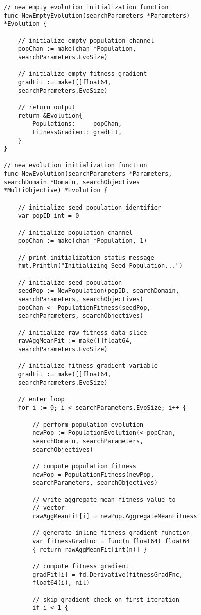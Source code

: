 \begin{lstlisting}[basicstyle=\small]
// new empty evolution initialization function
func NewEmptyEvolution(searchParameters *Parameters) 
*Evolution {

	// initialize empty population channel
	popChan := make(chan *Population, 
	searchParameters.EvoSize)

	// initialize empty fitness gradient
	gradFit := make([]float64, 
	searchParameters.EvoSize)

	// return output
	return &Evolution{
		Populations:     popChan,
		FitnessGradient: gradFit,
	}
}

// new evolution initialization function
func NewEvolution(searchParameters *Parameters, 
searchDomain *Domain, searchObjectives 
*MultiObjective) *Evolution {

	// initialize seed population identifier
	var popID int = 0

	// initialize population channel
	popChan := make(chan *Population, 1)

	// print initialization status message
	fmt.Println("Initializing Seed Population...")

	// initialize seed population
	seedPop := NewPopulation(popID, searchDomain, 
	searchParameters, searchObjectives)
	popChan <- PopulationFitness(seedPop, 
	searchParameters, searchObjectives)

	// initialize raw fitness data slice
	rawAggMeanFit := make([]float64, 
	searchParameters.EvoSize)

	// initialize fitness gradient variable
	gradFit := make([]float64, 
	searchParameters.EvoSize)

	// enter loop
	for i := 0; i < searchParameters.EvoSize; i++ {

		// perform population evolution
		newPop := PopulationEvolution(<-popChan, 
		searchDomain, searchParameters, 
		searchObjectives)

		// compute population fitness
		newPop = PopulationFitness(newPop, 
		searchParameters, searchObjectives)

		// write aggregate mean fitness value to 
		// vector
		rawAggMeanFit[i] = newPop.AggregateMeanFitness

		// generate inline fitness gradient function
		var fitnessGradFnc = func(n float64) float64 
		{ return rawAggMeanFit[int(n)] }

		// compute fitness gradient
		gradFit[i] = fd.Derivative(fitnessGradFnc, 
		float64(i), nil)

		// skip gradient check on first iteration
		if i < 1 {


\end{lstlisting}
